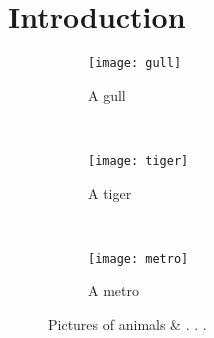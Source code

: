 \documentclass[12pt,]{article}
\begin{document}
\listoffigures
\section{Introduction}

\begin{figure}
    \centering
    \begin{subfigure}[b]{0.3\textwidth}
        \texttt{[image: gull]}
        \caption{A gull}
        \label{fig:gull}
    \end{subfigure}
    ~ %
    \begin{subfigure}[b]{0.3\textwidth}
        \texttt{[image: tiger]}
        \caption{A tiger}
        \label{fig:tiger}
    \end{subfigure}
    ~ %
    \begin{subfigure}[b]{0.3\textwidth}
        \texttt{[image: metro]}
        \caption{A metro}
        \label{fig:mouse}
    \end{subfigure}
    \caption{Pictures of animals & . . . }\label{fig & . . .}
\end{figure}
\end{document}
